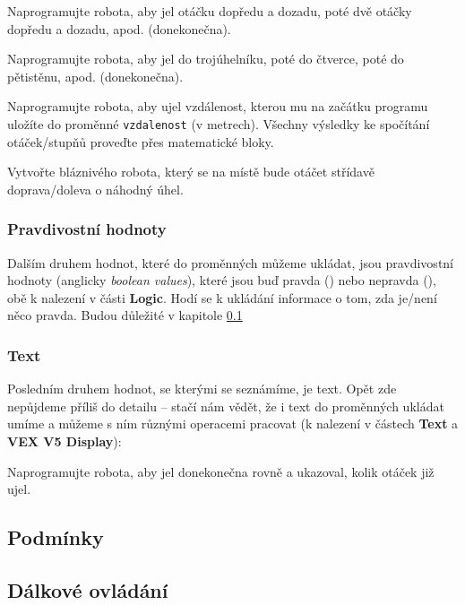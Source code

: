 \documentclass[../main.tex]{subfiles}
\begin{document}
	\begin{question}
		Naprogramujte robota, aby jel otáčku dopředu a dozadu, poté dvě otáčky dopředu a dozadu, apod. (donekonečna).
	\end{question}

	\begin{question*}
		Naprogramujte robota, aby jel do trojúhelníku, poté do čtverce, poté do pětistěnu, apod. (donekonečna).
	\end{question*}

	\begin{question}
		Naprogramujte robota, aby ujel vzdálenost, kterou mu na začátku programu uložíte do proměnné \texttt{vzdalenost} (v metrech). Všechny výsledky ke spočítání otáček/stupňů proveďte přes matematické bloky.
	\end{question}

	\begin{question}
		Vytvořte bláznivého robota, který se na místě bude otáčet střídavě doprava/doleva o náhodný úhel.
	\end{question}
	
	\subsubsection{Pravdivostní hodnoty}
	Dalším druhem hodnot, které do proměnných můžeme ukládat, jsou pravdivostní hodnoty (anglicky \textit{boolean values}), které jsou buď pravda (\blockLogicTrueImageBaseline) nebo nepravda (\blockLogicTrueImageBaseline), obě k nalezení v části \textbf{Logic}. Hodí se k ukládání informace o tom, zda je/není něco pravda. Budou důležité v kapitole \ref{cha:logic}

	\subsubsection{Text}
	Posledním druhem hodnot, se kterými se seznámíme, je text. Opět zde nepůjdeme příliš do detailu -- stačí nám vědět, že i text do proměnných ukládat umíme a můžeme s ním různými operacemi pracovat (k nalezení v částech \textbf{Text} a \textbf{VEX V5 Display}):

	\begin{itemize}
		\blockString
		\blockDisplayPrint
		\blockDisplayClear
	\end{itemize}

	\begin{question}
		Naprogramujte robota, aby jel donekonečna rovně a ukazoval, kolik otáček již ujel.
	\end{question}

	\subsection{Podmínky}\label{cha:logic}

	\subsection{Dálkové ovládání}
\end{document}
